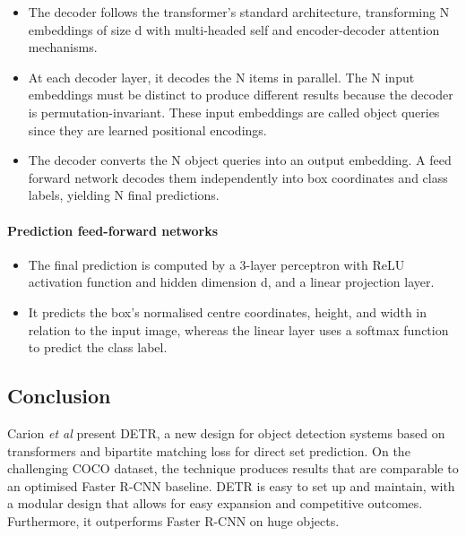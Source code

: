 \begin{itemize}
	\item The decoder follows the transformer's standard architecture, transforming N embeddings of size d with multi-headed self and encoder-decoder attention mechanisms.
	\item At each decoder layer, it decodes the N items in parallel. The N input embeddings must be distinct to produce different results because the decoder is permutation-invariant. These input embeddings are called object queries since they are learned positional encodings.
	\item The decoder converts the N object queries into an output embedding. A feed forward network decodes them independently into box coordinates and class labels, yielding N final predictions. 
\end{itemize}	

\paragraph{Prediction feed-forward networks}

\begin{itemize}
	\item The final prediction is computed by a 3-layer perceptron with ReLU activation function and hidden dimension d, and a linear projection layer. 
	\item It predicts the box's normalised centre coordinates, height, and width in relation to the input image, whereas the linear layer uses a softmax function to predict the class label. 
\end{itemize}	

\subsection{Conclusion}
\par Carion \textit{et al} present DETR, a new design for object detection systems based on transformers and bipartite matching loss for direct set prediction. On the challenging COCO dataset, the technique produces results that are comparable to an optimised Faster R-CNN baseline. DETR is easy to set up and maintain, with a modular design that allows for easy expansion and competitive outcomes. Furthermore, it outperforms Faster R-CNN on huge objects.